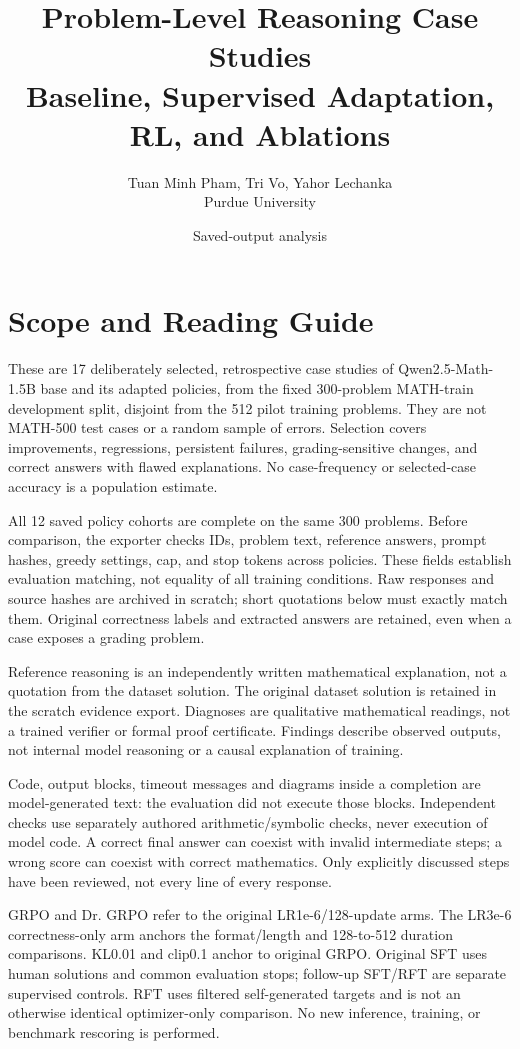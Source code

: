 \documentclass[10pt,letterpaper]{article}
\title{Problem-Level Reasoning Case Studies\\Baseline, Supervised Adaptation, RL, and Ablations}
\author{Tuan Minh Pham, Tri Vo, Yahor Lechanka\\Purdue University}
\date{Saved-output analysis}
\begin{document}
\maketitle\section*{Scope and Reading Guide}
These are 17 deliberately selected, retrospective case studies of Qwen2.5-Math-1.5B base and its adapted policies, from the fixed 300-problem MATH-train development split, disjoint from the 512 pilot training problems. They are not MATH-500 test cases or a random sample of errors. Selection covers improvements, regressions, persistent failures, grading-sensitive changes, and correct answers with flawed explanations. No case-frequency or selected-case accuracy is a population estimate.


All 12 saved policy cohorts are complete on the same 300 problems. Before comparison, the exporter checks IDs, problem text, reference answers, prompt hashes, greedy settings, cap, and stop tokens across policies. These fields establish evaluation matching, not equality of all training conditions. Raw responses and source hashes are archived in scratch; short quotations below must exactly match them. Original correctness labels and extracted answers are retained, even when a case exposes a grading problem.


Reference reasoning is an independently written mathematical explanation, not a quotation from the dataset solution. The original dataset solution is retained in the scratch evidence export. Diagnoses are qualitative mathematical readings, not a trained verifier or formal proof certificate. Findings describe observed outputs, not internal model reasoning or a causal explanation of training.


Code, output blocks, timeout messages and diagrams inside a completion are model-generated text: the evaluation did not execute those blocks. Independent checks use separately authored arithmetic/symbolic checks, never execution of model code. A correct final answer can coexist with invalid intermediate steps; a wrong score can coexist with correct mathematics. Only explicitly discussed steps have been reviewed, not every line of every response.


GRPO and Dr. GRPO refer to the original LR1e-6/128-update arms. The LR3e-6 correctness-only arm anchors the format/length and 128-to-512 duration comparisons. KL0.01 and clip0.1 anchor to original GRPO. Original SFT uses human solutions and common evaluation stops; follow-up SFT/RFT are separate supervised controls. RFT uses filtered self-generated targets and is not an otherwise identical optimizer-only comparison. No new inference, training, or benchmark rescoring is performed.
\end{document}
